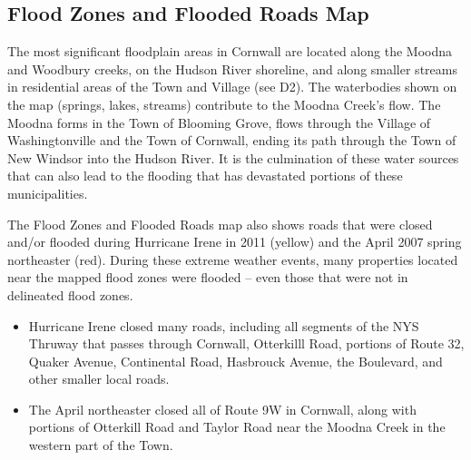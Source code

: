 \subsection*{Flood Zones and Flooded Roads Map}
The most significant floodplain areas in Cornwall are located along the Moodna 
and Woodbury creeks, on the Hudson River shoreline, and along smaller streams 
in residential areas of the Town and Village (see D2). The waterbodies shown on 
the map (springs, lakes, streams) contribute to the Moodna Creek’s flow. The 
Moodna forms in the Town of Blooming Grove, flows through the Village of 
Washingtonville and the Town of Cornwall, ending its path through the Town of 
New Windsor into the Hudson River. It is the culmination of these water sources 
that can also lead to the flooding that has devastated portions of these 
municipalities.
\par
The Flood Zones and Flooded Roads map also shows roads that were closed and/or 
flooded during Hurricane Irene in 2011 (yellow) and the April 2007 spring 
northeaster (red). During these extreme weather events, many properties located 
near the mapped flood zones were flooded – even those that were not in 
delineated flood zones.
\begin{itemize}
    \item Hurricane Irene closed many roads, including all segments of the NYS 
        Thruway that passes through Cornwall, Otterkilll Road, portions of 
        Route 32, Quaker Avenue, Continental Road, Hasbrouck Avenue, 
        the Boulevard, and other smaller local roads.
    \item The April northeaster closed all of Route 9W in Cornwall, along with 
        portions of Otterkill Road and Taylor Road near the Moodna Creek in 
        the western part of the Town.
\end{itemize}
\label{map:floodzonesandfloodedroads}

